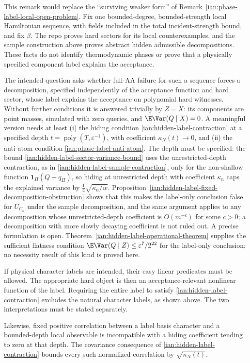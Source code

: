 \begin{remark}
\label{ian:hidden-label-local-open-problem-replacement}
This remark would replace the ``surviving weaker form'' of Remark~\ref{ian:phase-label-local-open-problem}. Fix one bounded-degree, bounded-strength local Hamiltonian sequence, with fields included in the total incident-strength bound, and fix \(\beta\). The repo proves hard sectors for its local counterexamples, and the sample construction above proves abstract hidden admissible decompositions. These facts do not identify thermodynamic phases or prove that a physically specified component label explains the acceptance.

The intended question asks whether full-AA failure for such a sequence forces a decomposition, specified independently of the acceptance function and hard sector, whose label explains the acceptance on polynomial hard witnesses. Without further conditions it is answered trivially by \(Z=X\): its components are point masses, simulated with zero queries, and \(\E\Var(Q\mid X)=0\). A meaningful version needs at least (i) the hiding condition \eqref{ian:hidden-label-contraction} at a specified depth \(t=\operatorname{poly}(T,\varepsilon^{-1})\), with coefficient \(\kappa_N(t)\to0\), and (ii) the anti-atom condition \eqref{ian:phase-label-anti-atom}. The depth must be specified: the bound \eqref{ian:hidden-label-sector-variance-bound} uses the unrestricted-depth contraction, as in \eqref{ian:hidden-label-sample-contraction}, only for the non-shallow function \(\mathbf1_H(Q-q_H)\), so hiding at unrestricted depth with coefficient \(\kappa_n\) caps the explained variance by \(\frac14\sqrt{\kappa_n/w}\). Proposition~\ref{ian:hidden-label-fixed-decomposition-obstruction} shows that this makes the label-only conclusion false for \(U_{C_n}\) under the sample decomposition, and the same argument applies to any decomposition whose unrestricted-depth coefficient is \(O(m^{-c})\) for some \(c>0\); a decomposition with more slowly decaying coefficient is not ruled out. A precise formulation is open. Theorem~\ref{ian:hidden-label-operational-theorem} supplies the sufficient flatness condition \(\E\Var(Q\mid Z)\le\varepsilon^7/2^{22}\) for the label-only conclusion; no necessity result of this kind is proved here.

If physical character labels are intended, their easy linear predicates must be allowed. The appropriate hard object is then an acceptance-relevant nonlinear function of the label. Requiring the entire label to satisfy
\eqref{ian:hidden-label-contraction} excludes the natural character labels, as shown above. The two interpretations must be stated separately.

Likewise, fixed positive correlation between a label basis character and a bounded-depth local observable is incompatible with a hiding coefficient tending to zero at that depth. The covariance consequence of
\eqref{ian:hidden-label-contraction} bounds every such normalized correlation by \(\sqrt{\kappa_N(t)}\).
\end{remark}

